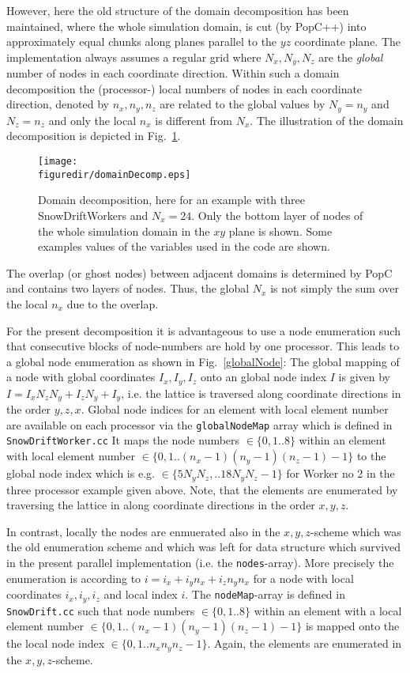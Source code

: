 \documentclass[12pt]{report}
\def\figuredir{./figures}
\begin{document}
However, here the old structure of the domain decomposition has been
maintained, where the whole simulation domain, is cut (by PopC++) into
approximately equal chunks along planes parallel to the $yz$
coordinate plane. The implementation always assumes a regular grid
where $N_x,N_y,N_z$ are the {\em global} number of nodes in each
coordinate direction. Within such a domain decomposition the
(processor-) local numbers of nodes in each coordinate direction,
denoted by $n_x,n_y,n_z$ are related to the global values by $N_y=n_y$
and $N_z=n_z$ and only the local $n_x$ is different from $N_x$. The
illustration of the domain decomposition is depicted in Fig.\
\ref{decomp}.
\begin{figure}[t]
  \label{decomp}
  \begin{center}
    \noindent\texttt{[image: \\figuredir/domainDecomp.eps]}
  \end{center}
  \caption{Domain decomposition, here for an example with three
    SnowDriftWorkers and $N_x=24$. Only the bottom layer of nodes of
    the whole simulation domain in the $xy$ plane is shown. Some
    examples values of the variables used in the code are shown.}
\end{figure}
The overlap (or ghost nodes) between adjacent domains is determined by
PopC and contains two layers of nodes. Thus, the global $N_x$ is not
simply the sum over the local $n_x$ due to the overlap.

For the present decomposition it is advantageous to use a node
enumeration such that consecutive blocks of node-numbers are hold by
one processor. This leads to a global node enumeration as shown in
Fig.\ \ref{globalNode}: The global mapping of a node with global
coordinates $I_x,I_y,I_z$ onto an global node index $I$ is given by
$I=I_xN_zN_y+I_zN_y+I_y$, i.e. the lattice is traversed along
coordinate directions in the order $y,z,x$. Global node indices for an
element with local element number are available on each processor via
the \verb+globalNodeMap+ array which is defined in
\verb+SnowDriftWorker.cc+ It maps the node numbers $\in\{0,1..8\}$
within an element with local element number
$\in\{0,1..(n_x-1)(n_y-1)(n_z-1)-1\}$ to the global node index which
is e.g. $\in\{5N_yN_z,..18N_yN_z-1\}$ for Worker no 2 in the three
processor example given above. Note, that the elements are enumerated
by traversing the lattice in along coordinate directions in the order
$x,y,z$.

In contrast, locally the nodes are enmuerated also in the
$x,y,z$-scheme which was the old enumeration scheme and which was left
for data structure which survived in the present parallel
implementation (i.e. the \verb+nodes+-array). More precisely the
enumeration is according to $i=i_x+i_yn_x+i_zn_yn_x$ for a node with
local coordinates $i_x,i_y,i_z$ and local index $i$. The
\verb+nodeMap+-array is defined in \verb+SnowDrift.cc+ such that node
numbers $\in\{0,1..8\}$ within an element with a local element number
$\in\{0,1..(n_x-1)(n_y-1)(n_z-1)-1\}$ is mapped onto the the local
node index $\in\{0,1..n_xn_yn_z-1\}$. Again, the elements
are enumerated in the $x,y,z$-scheme.
\end{document}
